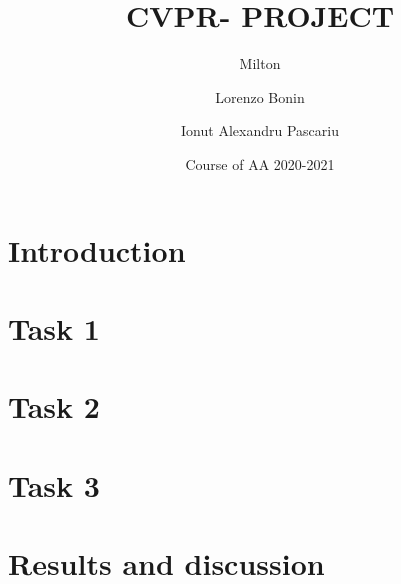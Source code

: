 \documentclass[11pt,a4paper]{article}
\begin{document}
\thispagestyle{empty}
\setcounter{page}{-2}




\title{CVPR- PROJECT} %
\author[1]{Milton} %
\author[2]{Lorenzo Bonin}
\author[3]{Ionut Alexandru Pascariu}



\date{Course of AA 2020-2021}
\maketitle
\thispagestyle{empty}
\newpage


\newcommand{\omissis}{[\textellipsis\unkern]}


\clearpage{\pagestyle{empty}\cleardoublepage}

\newpage
\thispagestyle{empty}
\phantom{.}
\newpage


\tableofcontents
\thispagestyle{empty}
\newpage



\section{Introduction}

\section{Task 1}


\section{Task 2}\label{2}


\section{Task 3}\label{3}


\section{Results and discussion}


\newpage
\printbibliography
\newpage





\newpage
\end{document}
